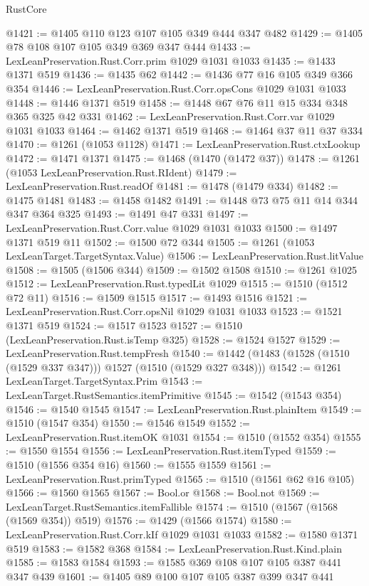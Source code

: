 \begin{lexlean}{RustCore}
\begin{coremodule}
@1421 := @1405 @110 @123 @107 @105 @349 @444 @347 @482
@1429 := @1405 @78 @108 @107 @105 @349 @369 @347 @444
@1433 := LexLeanPreservation.Rust.Corr.prim @1029 @1031 @1033
@1435 := @1433 @1371 @519
@1436 := @1435 @62
@1442 := @1436 @77 @16 @105 @349 @366 @354
@1446 := LexLeanPreservation.Rust.Corr.opsCons @1029 @1031 @1033
@1448 := @1446 @1371 @519
@1458 := @1448 @67 @76 @11 @15 @334 @348 @365 @325 @42 @331
@1462 := LexLeanPreservation.Rust.Corr.var @1029 @1031 @1033
@1464 := @1462 @1371 @519
@1468 := @1464 @37 @11 @37 @334
@1470 := @1261 (@1053 @1128)
@1471 := LexLeanPreservation.Rust.ctxLookup
@1472 := @1471 @1371
@1475 := @1468 (@1470 (@1472 @37))
@1478 := @1261 (@1053 LexLeanPreservation.Rust.RIdent)
@1479 := LexLeanPreservation.Rust.readOf
@1481 := @1478 (@1479 @334)
@1482 := @1475 @1481
@1483 := @1458 @1482
@1491 := @1448 @73 @75 @11 @14 @344 @347 @364 @325
@1493 := @1491 @47 @331
@1497 := LexLeanPreservation.Rust.Corr.value @1029 @1031 @1033
@1500 := @1497 @1371 @519 @11
@1502 := @1500 @72 @344
@1505 := @1261 (@1053 LexLeanTarget.TargetSyntax.Value)
@1506 := LexLeanPreservation.Rust.litValue
@1508 := @1505 (@1506 @344)
@1509 := @1502 @1508
@1510 := @1261 @1025
@1512 := LexLeanPreservation.Rust.typedLit @1029
@1515 := @1510 (@1512 @72 @11)
@1516 := @1509 @1515
@1517 := @1493 @1516
@1521 := LexLeanPreservation.Rust.Corr.opsNil @1029 @1031 @1033
@1523 := @1521 @1371 @519
@1524 := @1517 @1523
@1527 := @1510 (LexLeanPreservation.Rust.isTemp @325)
@1528 := @1524 @1527
@1529 := LexLeanPreservation.Rust.tempFresh
@1540 := @1442 (@1483 (@1528 (@1510 (@1529 @337 @347))) @1527 (@1510 (@1529 @327 @348)))
@1542 := @1261 LexLeanTarget.TargetSyntax.Prim
@1543 := LexLeanTarget.RustSemantics.itemPrimitive
@1545 := @1542 (@1543 @354)
@1546 := @1540 @1545
@1547 := LexLeanPreservation.Rust.plainItem
@1549 := @1510 (@1547 @354)
@1550 := @1546 @1549
@1552 := LexLeanPreservation.Rust.itemOK @1031
@1554 := @1510 (@1552 @354)
@1555 := @1550 @1554
@1556 := LexLeanPreservation.Rust.itemTyped
@1559 := @1510 (@1556 @354 @16)
@1560 := @1555 @1559
@1561 := LexLeanPreservation.Rust.primTyped
@1565 := @1510 (@1561 @62 @16 @105)
@1566 := @1560 @1565
@1567 := Bool.or
@1568 := Bool.not
@1569 := LexLeanTarget.RustSemantics.itemFallible
@1574 := @1510 (@1567 (@1568 (@1569 @354)) @519)
@1576 := @1429 (@1566 @1574)
@1580 := LexLeanPreservation.Rust.Corr.kIf @1029 @1031 @1033
@1582 := @1580 @1371 @519
@1583 := @1582 @368
@1584 := LexLeanPreservation.Rust.Kind.plain
@1585 := @1583 @1584
@1593 := @1585 @369 @108 @107 @105 @387 @441 @347 @439
@1601 := @1405 @89 @100 @107 @105 @387 @399 @347 @441

\end{coremodule}
\end{lexlean}
